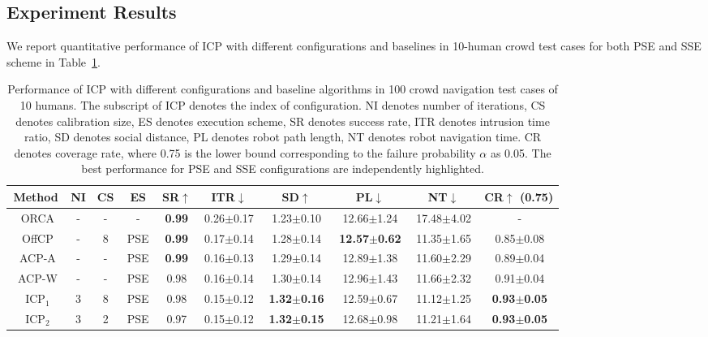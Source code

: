 \subsection{Experiment Results}
We report quantitative performance of ICP with different configurations and baselines in 10-human crowd test cases for both PSE and SSE scheme in Table~\ref{table-quantitative}. 
\begin{table}[hbt!]
\caption{Performance of ICP with different configurations and baseline algorithms in 100 crowd navigation test cases of 10 humans. The subscript of ICP denotes the index of configuration. NI denotes number of iterations, CS denotes calibration size, ES denotes execution scheme, SR denotes success rate, ITR denotes intrusion time ratio, SD denotes social distance, PL denotes robot path length, NT denotes robot navigation time. CR denotes coverage rate, where 0.75 is the lower bound corresponding to the failure probability $\alpha$ as 0.05. The best performance for PSE and SSE configurations are independently highlighted.}\label{table-quantitative}
\begin{center}
\fontsize{7}{10}\selectfont
\begin{tabular}{c|ccc|cccccc}
    \hline
    Method & NI & CS & ES & SR$\uparrow$ & ITR$\downarrow$ & SD$\uparrow$ & PL$\downarrow$ & NT$\downarrow$ & CR$\uparrow$ (0.75) \\
    \hline
    \, ORCA\, & \,-\, & \,-\, & \,-\, & \,\textbf{0.99}\, & \,0.26$\pm$0.17\, & \,1.23$\pm$0.10\, & \,12.66$\pm$1.24\, & \,17.48$\pm$4.02\, & \,- \\
    \, OffCP\, & \,-\, & \,8\, & \,PSE\, & \,\textbf{0.99}\, & \,0.17$\pm$0.14\, & \,1.28$\pm$0.14\, & \,\textbf{12.57$\pm$0.62}\, & \,11.35$\pm$1.65\, & \,0.85$\pm$0.08 \\
    \, ACP-A\, & \,-\, & \,-\, & \,PSE\, & \,\textbf{0.99}\, & \,0.16$\pm$0.13\, & \,1.29$\pm$0.14\, & \,12.89$\pm$1.38\, & \,11.60$\pm$2.29\, & \,0.89$\pm$0.04 \\
    \, ACP-W\, & \,-\, & \,-\, & \,PSE\, & \,0.98\, & \,0.16$\pm$0.14\, & \,1.30$\pm$0.14\, & \,12.96$\pm$1.43\, & \,11.66$\pm$2.32\, & \,0.91$\pm$0.04 \\
    \, ICP$_1$\, & \,3\, & \,8\, & \,PSE\, & \,0.98\, & \,0.15$\pm$0.12\, & \,\textbf{1.32$\pm$0.16}\, & \,12.59$\pm$0.67\, & \,11.12$\pm$1.25\, & \,\textbf{0.93$\pm$0.05} \\
    \hline
    \, ICP$_2$\, & \,3\, & \,2\, & \,PSE\, & \,0.97\, & \,0.15$\pm$0.12\, & \,\textbf{1.32$\pm$0.15}\, & \,12.68$\pm$0.98\, & \,11.21$\pm$1.64\, & \,\textbf{0.93$\pm$0.05} \\

\end{tabular}
\end{center}
\end{table}
